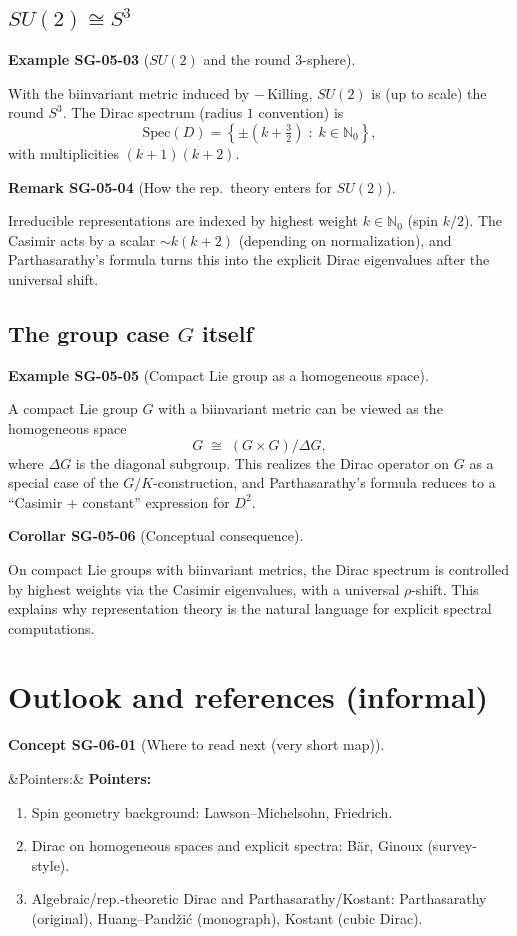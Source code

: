\documentclass[10pt, letterpaper]{article}
\newcommand{\N}{\mathbb{N}}
\newenvironment{romanenum}[1][]
  {%
    \ifx&#1&
    \else
      \textbf{#1}\quad
    \fi
    \begin{enumerate}[label=\roman*)]
  }
  {%
    \end{enumerate}%
  }
\newcommand{\CustomHeading}[3]{%
  \par\medskip\noindent%
  \textbf{#1 #2} \textnormal{(#3)}.\enskip%
}
\newenvironment{KORO}[2]{\begin{unitbox}\CustomHeading{Corollar}{#1}{#2}}{\end{unitbox}}
\newenvironment{REM}[2]{\begin{unitbox}\CustomHeading{Remark}{#1}{#2}}{\end{unitbox}}
\newenvironment{EXA}[2]{\begin{unitbox}\CustomHeading{Example}{#1}{#2}}{\end{unitbox}}
\newenvironment{CONC}[2]{\begin{unitbox}\CustomHeading{Concept}{#1}{#2}}{\end{unitbox}}
\begin{document}
\subsection{$SU(2)\cong S^3$}
\begin{EXA}{SG-05-03}{$SU(2)$ and the round $3$-sphere}
With the biinvariant metric induced by $-\,\mathrm{Killing}$, $SU(2)$ is (up to scale) the round $S^3$.
The Dirac spectrum (radius $1$ convention) is
\[
\mathrm{Spec}(D)=\left\{\pm\left(k+\tfrac32\right)\;:\;k\in\N_0\right\},
\]
with multiplicities $(k+1)(k+2)$.
\end{EXA}

\begin{REM}{SG-05-04}{How the rep.\ theory enters for $SU(2)$}
Irreducible representations are indexed by highest weight $k\in\N_0$ (spin $k/2$).
The Casimir acts by a scalar $\sim k(k+2)$ (depending on normalization),
and Parthasarathy's formula turns this into the explicit Dirac eigenvalues after the universal shift.
\end{REM}

\subsection{The group case $G$ itself}
\begin{EXA}{SG-05-05}{Compact Lie group as a homogeneous space}
A compact Lie group $G$ with a biinvariant metric can be viewed as the homogeneous space
\[
G \;\cong\; (G\times G)/\Delta G,
\]
where $\Delta G$ is the diagonal subgroup. This realizes the Dirac operator on $G$ as a special case of the $G/K$-construction,
and Parthasarathy's formula reduces to a ``Casimir + constant'' expression for $D^2$.
\end{EXA}

\begin{KORO}{SG-05-06}{Conceptual consequence}
On compact Lie groups with biinvariant metrics, the Dirac spectrum is controlled by highest weights via the Casimir eigenvalues,
with a universal $\rho$-shift. This explains why representation theory is the natural language for explicit spectral computations.
\end{KORO}

\section{Outlook and references (informal)}

\begin{CONC}{SG-06-01}{Where to read next (very short map)}
\begin{romanenum}[Pointers:]
\item Spin geometry background: Lawson--Michelsohn, Friedrich.
\item Dirac on homogeneous spaces and explicit spectra: B\"ar, Ginoux (survey-style).
\item Algebraic/rep.-theoretic Dirac and Parthasarathy/Kostant: Parthasarathy (original), Huang--Pand\v{z}i\'c (monograph), Kostant (cubic Dirac).
\end{romanenum}
\end{CONC}
\end{document}
